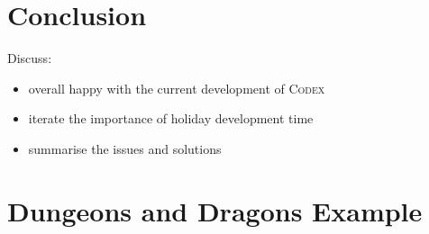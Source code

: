 \documentclass[progress]{cmpreport}
\newcommand{\Codex}{\textsc{Codex}}
\begin{document}
	\section{Conclusion}
	Discuss:
	\begin{itemize}
		\item overall happy with the current development of \Codex
			\subitem 
		\item iterate the importance of holiday development time
		\item summarise the issues and solutions
	\end{itemize}

	\clearpage
	\appendix
	\section{Dungeons and Dragons Example} \label{app:example}
\end{document}
